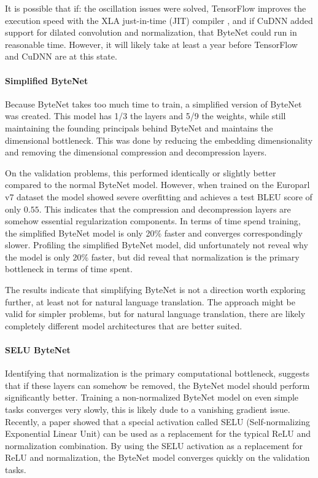 It is possible that if: the oscillation issues were solved, TensorFlow improves the execution speed with the XLA just-in-time (JIT) compiler \cite{google-xla}, and if CuDNN added support for dilated convolution and normalization, that ByteNet could run in reasonable time. However, it will likely take at least a year before TensorFlow and CuDNN are at this state.

\paragraph{Simplified ByteNet} Because ByteNet takes too much time to train, a simplified version of ByteNet was created. This model has 1/3 the layers and 5/9 the weights, while still maintaining the founding principals behind ByteNet and maintains the dimensional bottleneck. This was done by reducing the embedding dimensionality and removing the dimensional compression and decompression layers.

On the validation problems, this performed identically or slightly better compared to the normal ByteNet model. However, when trained on the Europarl v7 dataset the model showed severe overfitting and achieves a test BLEU score of only $0.55$. This indicates that the compression and decompression layers are somehow essential regularization components. In terms of time spend training, the simplified ByteNet model is only 20\% faster and converges correspondingly slower. Profiling the simplified ByteNet model, did unfortunately not reveal why the model is only 20\% faster, but did reveal that normalization is the primary bottleneck in terms of time spent.

The results indicate that simplifying ByteNet is not a direction worth exploring further, at least not for natural language translation. The approach might be valid for simpler problems, but for natural language translation, there are likely completely different model architectures that are better suited.

\paragraph{SELU ByteNet} Identifying that normalization is the primary computational bottleneck, suggests that if these layers can somehow be removed, the ByteNet model should perform significantly better. Training a non-normalized ByteNet model on even simple tasks converges very slowly, this is likely dude to a vanishing gradient issue. Recently, a paper showed that a special activation called SELU (Self-normalizing Exponential Linear Unit) can be used as a replacement for the typical ReLU and normalization combination. By using the SELU activation as a replacement for ReLU and normalization, the ByteNet model converges quickly on the validation tasks.

